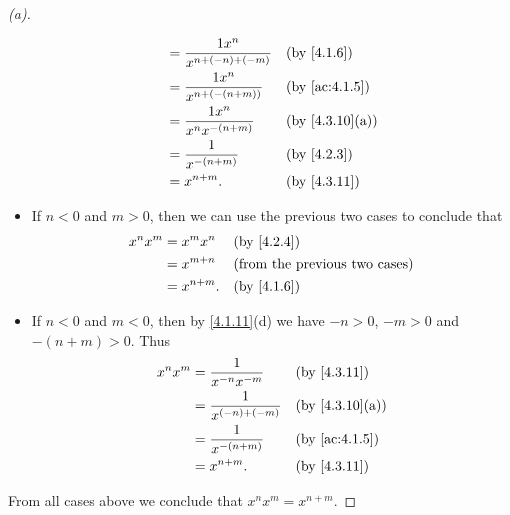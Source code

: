 \begin{proof}[(a)]
\begin{itemize}
\begin{align*}
                    & = \dfrac{1 x^n}{x^{n + (-n) + (-m)}} &  & \by{4.1.6}     \\
                    & = \dfrac{1 x^n}{x^{n + (-(n + m))}}  &  & \by{ac:4.1.5}  \\
                    & = \dfrac{1 x^n}{x^n x^{-(n + m)}}    &  & \by{4.3.10}[a] \\
                    & = \dfrac{1}{x^{-(n + m)}}            &  & \by{4.2.3}     \\
                    & = x^{n + m}.                         &  & \by{4.3.11}
          \end{align*}
    \item If \(n < 0\) and \(m > 0\), then we can use the previous two cases to conclude that
          \begin{align*}
            x^n x^m & = x^m x^n    &  & \by{4.2.4}                           \\
                    & = x^{m + n}  &  & \text{(from the previous two cases)} \\
                    & = x^{n + m}. &  & \by{4.1.6}
          \end{align*}
    \item If \(n < 0\) and \(m < 0\), then by \cref{4.1.11}(d) we have \(-n > 0\), \(-m > 0\) and \(-(n + m) > 0\).
          Thus
          \begin{align*}
            x^n x^m & = \dfrac{1}{x^{-n} x^{-m}}   &  & \by{4.3.11}    \\
                    & = \dfrac{1}{x^{(-n) + (-m)}} &  & \by{4.3.10}[a] \\
                    & = \dfrac{1}{x^{-(n + m)}}    &  & \by{ac:4.1.5}  \\
                    & = x^{n + m}.                 &  & \by{4.3.11}
          \end{align*}
  \end{itemize}
  From all cases above we conclude that \(x^n x^m = x^{n + m}\).


\end{proof}
